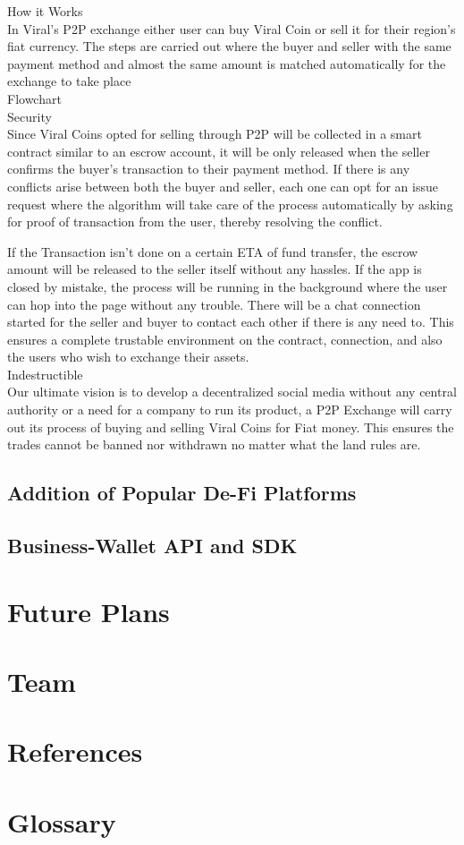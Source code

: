 \documentclass[10pt]{article}
\begin{document}
How it Works\\

In Viral's P2P exchange either user can buy Viral Coin or sell it for their region’s fiat currency. The steps are carried out where the buyer and seller with the same payment method and almost the same amount is matched automatically for the exchange to take place\\

Flowchart\\

Security\\

Since Viral Coins opted for selling through P2P will be collected in a smart contract similar to an escrow account, it will be only released when the seller confirms the buyer’s transaction to their payment method. If there is any conflicts arise between both the buyer and seller, each one can opt for an issue request where the algorithm will take care of the process automatically by asking for proof of transaction from the user, thereby resolving the conflict.

If the Transaction isn’t done on a certain ETA of fund transfer, the escrow amount will be released to the seller itself without any hassles. If the app is closed by mistake, the process will be running in the background where the user can hop into the page without any trouble. There will be a chat connection started for the seller and buyer to contact each other if there is any need to. This ensures a complete trustable environment on the contract, connection, and also the users who wish to exchange their assets.
\\
Indestructible\\

Our ultimate vision is to develop a decentralized social media without any central authority or a need for a company to run its product, a P2P Exchange will carry out its process of buying and selling Viral Coins for Fiat money. This ensures the trades cannot be banned nor withdrawn no matter what the land rules are.\\

\subsection{Addition of Popular De-Fi Platforms}

\subsection{Business-Wallet API and SDK}

\section{Future Plans}

\section{Team}

\section{References}

\section{Glossary}
\end{document}
